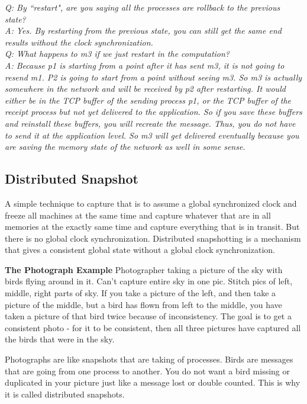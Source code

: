 \documentclass[twoside]{article}
\begin{document}
\textit{Q: By ``restart", are you saying all the processes are rollback to the previous state?\\
A: Yes. By restarting from the previous state, you can still get the same end results without the clock synchronization.\\
Q: What happens to m3 if we just restart in the computation?\\
A: Because p1 is starting from a point after it has sent m3, it is not going to resend m1. P2 is going to start from a point without seeing m3. So m3 is actually somewhere in the network and will be received by p2 after restarting. It would either be in the TCP buffer of the sending process p1, or the TCP buffer of the receipt process but not yet delivered to the application. So if you save these buffers and reinstall these buffers, you will recreate the message. Thus, you do not have to send it at the application level. So m3 will get delivered eventually because you are saving the memory state of the network as well in some sense.}

\subsection{Distributed Snapshot}

A simple technique to capture that is to assume a global synchronized clock and freeze all machines at the same time and capture whatever that are in all memories at the exactly same time and capture everything that is in transit. But there is no global clock synchronization. Distributed snapshotting is a mechanism that gives a consistent global state without a global clock synchronization.

\textbf{The Photograph Example} Photographer taking a picture of the sky with birds flying around in it. Can't capture entire sky in one pic. Stitch pics of left, middle, right parts of sky. If you take a picture of the left, and then take a picture of the middle, but a bird has flown from left to the middle, you have taken a picture of that bird twice because of inconsistency. The goal is to get a consistent photo - for it to be consistent, then all three pictures have captured all the birds that were in the sky.

Photographs are like snapshots that are taking of processes. Birds are messages that are going from one process to another. You do not want a bird missing or duplicated in your picture just like a message lost or double counted. This is why it is called distributed snapshots.
\end{document}
